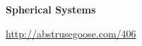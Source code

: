 \documentclass[letterpaper,landscape]{slides}
\begin{document}
\begin{slide}
\begin{center}
\bfseries
{\large {\color{blue} Spherical Systems} }
\end{center}
\vskip 0.8in

\begin{center}
\vskip -0.0in
\end{center}


\begin{flushright}
{\small \url{http://abstrusegoose.com/406}}
\end{flushright}

\vfill
\end{slide}
 
\end{document}
